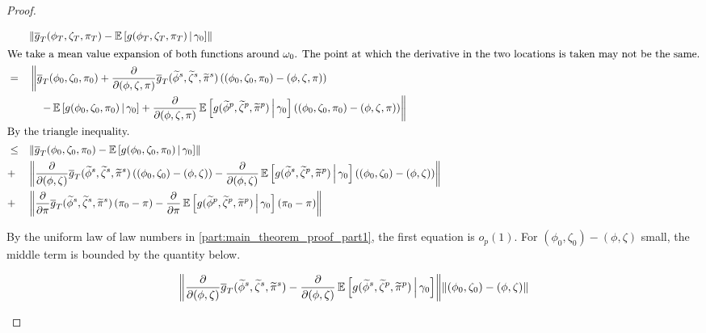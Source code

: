 \documentclass[11pt, letterpaper, twoside, final]{article}
\begin{document}
\begin{appendices}
\begin{proof}
\begin{proofpart}
    \begin{alignat}{2}
        & &&\norm*{\sampmom(\phi_T, \zeta_T, \pi_T) -  \E\left[\popmom(\phi_T, \zeta_T, \pi_T) \mvert
          \gamma_0\right] } \\ 
        \intertext{We take a mean value expansion of both functions around $\omega_0$. The point at which the
        derivative in the two locations is taken may not be the same.}
        &= &&\left\lVert \sampmom(\phi_0, \zeta_0, \pi_0) + \frac{\partial}{\partial (\phi, \zeta,
           \pi)}\sampmom(\widetilde{\phi}^s, \widetilde{\zeta}^s, \widetilde{\pi}^s)\left((\phi_0, \zeta_0, \pi_0)
            - (\phi, \zeta, \pi)\right)\right. \\
        &  &&\quad \left. - \E\left[\popmom(\phi_0, \zeta_0, \pi_0) \mvert \gamma_0\right] + 
           \frac{\partial}{\partial (\phi, \zeta, \pi)} \E\left[\popmom(\widetilde{\phi}^p, \widetilde{\zeta}^p,
           \widetilde{\pi}^p)\mvert \gamma_0\right] \left((\phi_0, \zeta_0, \pi_0) - (\phi, \zeta,
           \pi)\right) \right\rVert \\ 
        \intertext{By the triangle inequality.}
        &\leq && \norm*{\sampmom(\phi_0, \zeta_0, \pi_0) - \E\left[\popmom(\phi_0, \zeta_0, \pi_0) \mvert
           \gamma_0\right]}  \\
        &+  && \norm*{\frac{\partial}{\partial (\phi, \zeta)}\sampmom(\widetilde{\phi}^s, \widetilde{\zeta}^s,
          \widetilde{\pi}^s)\left((\phi_0, \zeta_0)  - (\phi, \zeta)\right) -  \frac{\partial}{\partial (\phi,
          \zeta)} \E\left[\popmom(\widetilde{\phi}^s, \widetilde{\zeta}^p, \widetilde{\pi}^p)\mvert \gamma_0\right]
          \left((\phi_0, \zeta_0) - (\phi, \zeta)\right)} \\
        &+  && \norm*{\frac{\partial}{\partial \pi}\sampmom(\widetilde{\phi}^s, \widetilde{\zeta}^s,
          \widetilde{\pi}^s)\left(\pi_0 - \pi\right) -  \frac{\partial}{\partial \pi}
          \E\left[\popmom(\widetilde{\phi}^p, \widetilde{\zeta}^p, \widetilde{\pi}^p)\mvert \gamma_0\right]
          \left(\pi_0 - \pi\right)} 
          \label{eqn:pi_derivative_term}
    \end{alignat}

    By the uniform law of law numbers in \cref{part:main_theorem_proof_part1}, the first equation is $o_p(1)$.
    For $(\phi_0, \zeta_0) - (\phi, \zeta)$ small, the middle term is bounded by the quantity below. 


    \begin{equation}
        \norm*{\frac{\partial}{\partial (\phi, \zeta)}\sampmom(\widetilde{\phi}^s, \widetilde{\zeta}^s,
        \widetilde{\pi}^s) -  \frac{\partial}{\partial (\phi, \zeta)} \E\left[\popmom(\widetilde{\phi}^s,
        \widetilde{\zeta}^p, \widetilde{\pi}^p)\mvert \gamma_0\right]} \norm*{(\phi_0, \zeta_0) - (\phi, \zeta)}
    \end{equation}


\end{proofpart}
\end{proof}
\end{appendices}
\end{document}
